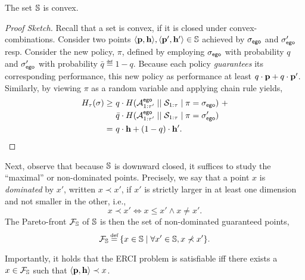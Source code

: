 \begin{proposition}
  The set $\mathbb{S}$ is convex. 
\end{proposition}
\begin{proof}[Proof Sketch]
  Recall that a set is convex, if it is closed under
  convex-combinations\footnotemark. Consider two points
  $\langle \mathbf{p}, \mathbf{h} \rangle, \langle \mathbf{p}',
  \mathbf{h}' \rangle \in \mathbb{S}$ achieved by ${\sigma_{\mathsf{ego}}}$ and
  ${\sigma'_{\mathsf{ego}}}$ resp. Consider the new policy,
  $\pi$, defined by employing ${\sigma_{\mathsf{ego}}}$ with
  probability $q$ and ${\sigma'_{\mathsf{ego}}}$ with probability $\bar{q} \eqdef 1 - q$.
  Because each policy \emph{guarantees} its corresponding performance,
  this new policy as performance at least $q\cdot \mathbf{p} + q\cdot \mathbf{p}'$.
  Similarly, by viewing $\pi$ as a random variable and applying chain
  rule yields,
  \begin{equation}
    \begin{split}
      H_\tau(\sigma) 
      \geq &~q \cdot H( {\mathcal{A}}^{\mathsf{ego}}_{1:\tau'} \mid\mid {\mathcal{S}}_{1:\tau} \mid \pi={\sigma_{\mathsf{ego}}})~+\\
      &~\bar{q}  \cdot H( {\mathcal{A}}^{\mathsf{ego}}_{1:\tau'} \mid\mid {\mathcal{S}}_{1:\tau} \mid \pi={\sigma'_{\mathsf{ego}}})\\
      =&~q\cdot\mathbf{h} + (1 - q)\cdot \mathbf{h}'.
    \end{split}
  \end{equation}
\end{proof}
\noindent
Next, observe that because $\mathbb{S}$ is downward closed, it
suffices to study the ``maximal'' or non-dominated points.  Precisely,
we say that a point $x$ is \emph{dominated} by $x'$, written $x \prec
x'$, if $x'$ is strictly larger in at least one dimension and not
smaller in the other, i.e., 
\begin{equation}
x \prec x' \iff x \leq x' \wedge x \neq x'.
\end{equation}
The Pareto-front $\mathcal{F}_{\mathbb{S}}$ of $\mathbb{S}$ is then the set of non-dominated guaranteed points,
\begin{equation}
  \pareto{\solutions} \eqdef \{ x \in \solutions \mid \forall x' \in \solutions, x \not\prec x'  \}.  
\end{equation}
\noindent
\begin{mdframed}
Importantly, it holds that the ERCI problem is satisfiable iff there exists a  $x \in \mathcal{F}_{\mathbb{S}}$ such that $\langle \mathbf{p}, \mathbf{h} \rangle \prec x$.    
\end{mdframed}

